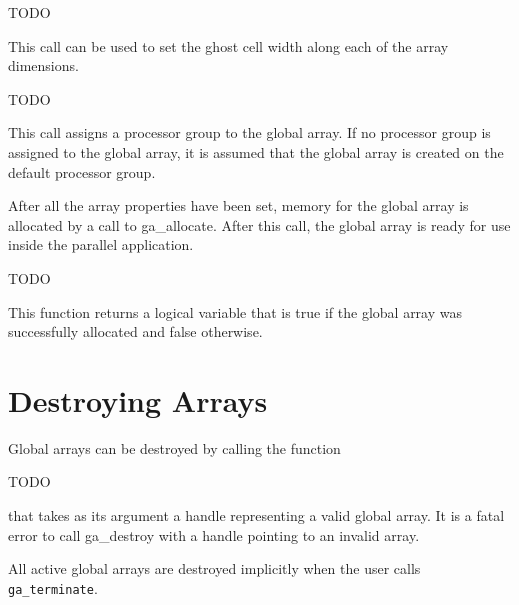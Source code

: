 TODO
%

This call can be used to set the ghost cell width along each of the array
dimensions.

TODO
%

This call assigns a processor group to the global array. If no processor group
is assigned to the global array, it is assumed that the global array is created
on the default processor group.

After all the array properties have been set, memory for the global array is
allocated by a call to ga\_allocate. After this call, the global array is ready
for use inside the parallel application.

TODO
%

This function returns a logical variable that is true if the global array was
successfully allocated and false otherwise. 

\section{Destroying Arrays}

Global arrays can be destroyed by calling the function

TODO
%
%

that takes as its argument a handle representing a valid global array.  It is a
fatal error to call ga\_destroy with a handle pointing to an invalid array.

All active global arrays are destroyed implicitly when the user calls
\texttt{ga\_terminate}.
